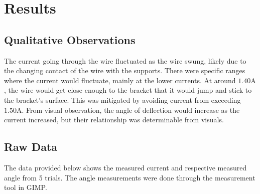 \section*{Results}

\subsection*{Qualitative Observations}

The current going through the wire fluctuated as the wire swung, likely due to the changing contact of the wire with the supports.
There were specific ranges where the current would fluctuate, mainly at the lower currents.
At around $1.40\si{\ampere}$, the wire would get close enough to the bracket that it would jump and stick to the bracket's surface.
This was mitigated by avoiding current from exceeding $1.50\si{\ampere}$.
From visual observation, the angle of deflection would increase as the current increased, but their relationship was determinable
from visuals.

\subsection*{Raw Data}

The data provided below shows the measured current and respective measured angle from 5 trials.
The angle measurements were done through the measurement tool in GIMP.

